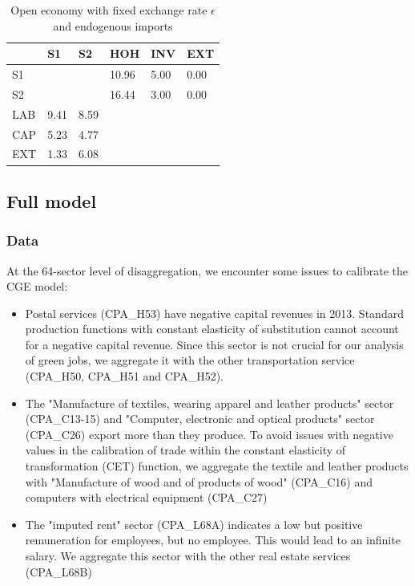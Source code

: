 \begin{table}[!h]
	\centering
	\caption{Open economy with fixed exchange rate $\epsilon$ and endogenous imports}
	\label{tab:SAM_IO_OpenEconomy_noBudget}
	\begin{tabular}{llllll}
		\toprule
		& S1 & S2 & HOH & INV & EXT \\
		\midrule
		S1 &  &  & 10.96 & 5.00 & 0.00 \\
		S2 &  &  & 16.44 & 3.00 & 0.00 \\
		LAB & 9.41 & 8.59 &  &  &  \\
		CAP & 5.23 & 4.77 &  &  &  \\
		EXT & 1.33 & 6.08 &  &  &  \\
		\bottomrule
	\end{tabular}
\end{table}



\clearpage

\subsection{Full model}
\label{sec:full_model}

\subsubsection{Data}
\label{app:full_model_data}

At the 64-sector level of disaggregation, we encounter some issues to calibrate the CGE model:
\begin{itemize}
	\item Postal services (CPA\_H53) have negative capital revenues in 2013. Standard production functions with constant elasticity of substitution cannot account for a negative capital revenue. 
	Since this sector is not crucial for our analysis of green jobs, we aggregate it with the other transportation service (CPA\_H50, CPA\_H51 and CPA\_H52).
	\item The "Manufacture of textiles, wearing apparel and leather products" sector (CPA\_C13-15) and "Computer, electronic and optical products" sector (CPA\_C26) export more than they produce. To avoid issues with negative values in the calibration of trade within the constant elasticity of transformation (CET) function, we aggregate the textile and leather products with "Manufacture of wood and of products of wood" (CPA\_C16) and computers with electrical equipment (CPA\_C27)
	\item The "imputed rent" sector (CPA\_L68A) indicates a low but positive remuneration for employees, but no employee. This would lead to an infinite salary. We aggregate this sector with the other real estate services (CPA\_L68B)
\end{itemize}



